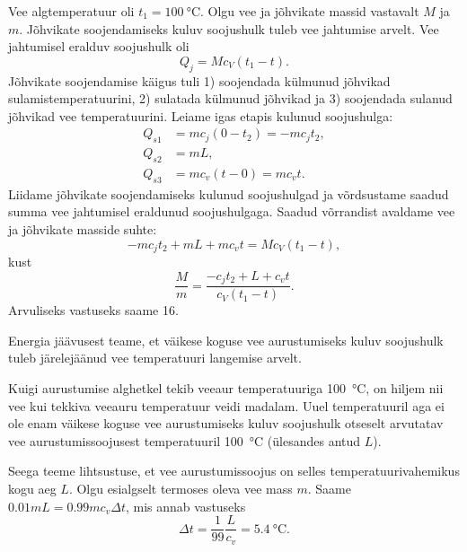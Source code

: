 \documentclass[10pt, twoside]{article}
\begin{document}
{
\solu
Vee algtemperatuur oli $t_1=\SI{100}{\degreeCelsius}$. Olgu vee ja jõhvikate massid vastavalt $M$ ja $m$. Jõhvikate soojendamiseks kuluv soojushulk tuleb vee jahtumise arvelt. Vee jahtumisel eralduv soojushulk oli
\[
Q_j=Mc_V(t_1-t).
\]
Jõhvikate soojendamise käigus tuli 1) soojendada külmunud jõhvikad sulamistemperatuurini, 2) sulatada külmunud jõhvikad ja 3) soojendada sulanud jõhvikad vee temperatuurini.
Leiame igas etapis kulunud soojushulga:
\[
\begin{aligned}
Q_{s1}&=mc_j(0-t_2)=-mc_jt_2,\\
Q_{s2}&=mL,\\
Q_{s3}&=mc_v(t-0)=mc_vt.
\end{aligned}
\]
Liidame jõhvikate soojendamiseks kulunud soojushulgad ja võrdsustame saadud summa vee jahtumisel eraldunud soojushulgaga. Saadud võrrandist avaldame vee ja jõhvikate masside suhte:
\[
-mc_jt_2+mL+mc_vt=Mc_V(t_1-t),
\]
kust
\[
\frac{M}{m}=\frac{-c_jt_2+L+c_vt}{c_V(t_1-t)}.
\]
Arvuliseks vastuseks saame \num{16}.
\probend
\bigskip


\solu
Energia jäävusest teame, et väikese koguse vee aurustumiseks kuluv soojushulk tuleb järelejäänud vee temperatuuri langemise arvelt.

Kuigi aurustumise alghetkel tekib veeaur temperatuuriga \SI{100}{\degreeCelsius}, on hiljem nii vee
kui tekkiva veeauru temperatuur veidi madalam. Uuel temperatuuril aga ei ole enam
väikese koguse vee aurustumiseks kuluv soojushulk otseselt arvutatav vee aurustumissoojusest temperatuuril \SI{100}{\degreeCelsius} (ülesandes antud $L$).

Seega teeme lihtsustuse, et vee aurustumissoojus on selles temperatuurivahemikus kogu aeg $L$. Olgu esialgselt termoses oleva vee mass $m$. Saame $\num{0,01}mL = \num{0,99}mc_v\Delta t$, mis annab vastuseks
\[
\Delta t=\frac{1}{99} \frac{L}{c_{v}}=\SI{5,4}{\degreeCelsius}.
\]
\probend
\bigskip


}
\end{document}
